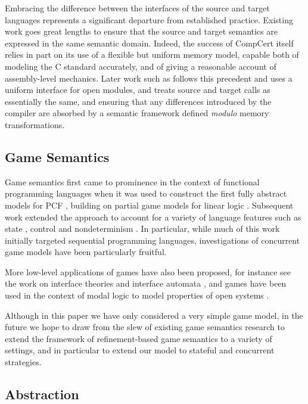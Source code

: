 \documentclass[sigplan,10pt,review,anonymous]{acmart}
\begin{document}


Embracing the difference between the interfaces of
the source and target languages
represents a significant departure from established practice.
Existing work goes great lengths
to ensure that the source and target semantics
are expressed in the same semantic domain.
Indeed,
the success of CompCert itself
relies in part on its use of a flexible
but uniform memory model,
capable both of modeling the C standard accurately,
and of giving a reasonable account
of assembly-level mechanics.
Later work such as \cite{compcompcert,cpp15}
follows this precedent and uses
a uniform interface for open modules,
and treats source and target calls
as essentially the same,
and ensuring that any differences introduced by the compiler
are absorbed by a semantic framework
defined \emph{modulo} memory transformations.

\subsection{Game Semantics} %

Game semantics first came to prominence
in the context of functional programming languages when
it was used to construct
the first fully abstract models for PCF
\cite{pcfajm,pcfho},
building on partial game models for linear logic
\cite{gsll,gsllaj}.
Subsequent work
extended the approach to account for a variety of
language features such as
state \cite{gsia},
control \cite{gscontrol} and
nondeterminism \cite{gsnondet}.
In particular,
while much of this work initially
targeted sequential programming languages,
investigations of concurrent game models
have been particularly fruitful.

More low-level applications of games have also been proposed,
for instance see the work on interface theories
and interface automata \cite{ia,gmos,itcd,gtf},
and games have been used in the context of modal logic
to model properties of open systems
\cite{atl,altref}.

Although in this paper we have only considered a very simple game model,
in the future we hope to draw from the slew of existing game semantics research
to extend the framework of refinement-based game semantics
to a variety of settings,
and in particular to extend our model
to stateful and concurrent strategies.


\subsection{Abstraction} %
\end{document}
